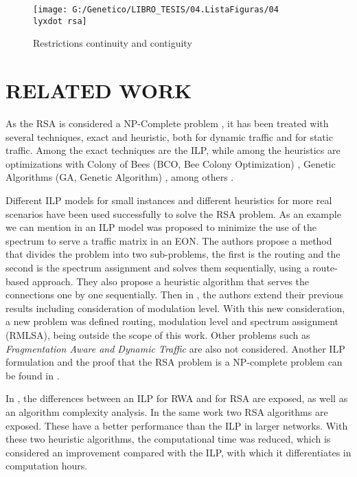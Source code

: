 \begin{figure}
\begin{centering}
\texttt{[image: G:/Genetico/LIBRO\_TESIS/04.ListaFiguras/04\\lyxdot rsa]}
\par\end{centering}
\caption{Restrictions continuity and contiguity}
\label{rsa_problem_figure}
\end{figure}


\section{RELATED WORK }

As the RSA is considered a NP-Complete problem \cite{IEEE:rsa-np-completo},
it has been treated with several techniques, exact and heuristic,
both for dynamic traffic and for static traffic. Among the exact techniques
are the ILP, while among the heuristics are optimizations with Colony
of Bees (BCO, Bee Colony Optimization) \cite{rsa:bco}, Genetic Algorithms
(GA, Genetic Algorithm) \cite{rsa:enfoque4,rsa:kshortestpath,daoGA-RSA},
among others \cite{aco-based}\cite{tabu-search}. 

Different ILP models for small instances and different heuristics
for more real scenarios have been used successfully to solve the RSA
problem. As an example we can mention in \cite{christodoulopoulos}
an ILP model was proposed to minimize the use of the spectrum to serve
a traffic matrix in an EON. The authors propose a method that divides
the problem into two sub-problems, the first is the routing and the
second is the spectrum assignment and solves them sequentially, using
a route-based approach. They also propose a heuristic algorithm that
serves the connections one by one sequentially. Then in \cite{Christodoulopoulos2011},
the authors extend their previous results including consideration
of modulation level. With this new consideration, a new problem was
defined routing, modulation level and spectrum assignment (RMLSA),
being outside the scope of this work. Other problems such as \textit{Fragmentation
Aware and Dynamic Traffic} are also not considered. Another ILP formulation
and the proof that the RSA problem is a NP-complete problem can be
found in \cite{IEEE:rsa-np-completo}. 

In \cite{Zhang2012rsa:restricciones2}, the differences between an
ILP for RWA and for RSA are exposed, as well as an algorithm complexity
analysis. In the same work two RSA algorithms are exposed. These have
a better performance than the ILP in larger networks. With these two
heuristic algorithms, the computational time was reduced, which is
considered an improvement compared with the ILP, with which it differentiates
in computation hours. 

